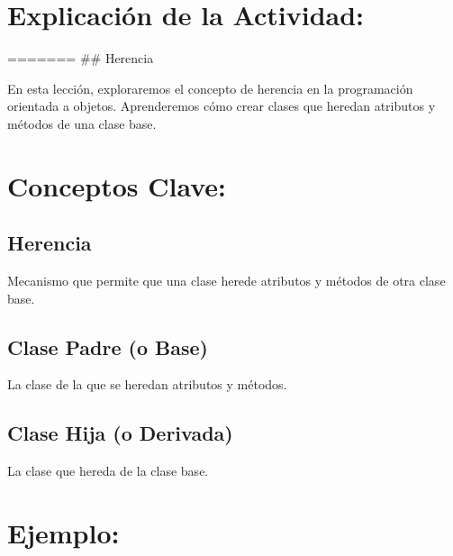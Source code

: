 \documentclass[
  a4paper,
  DIV=11,
  numbers=noendperiod,
  onepage,
  openany]{scrreprt}
\begin{document}
\hypertarget{explicaciuxf3n-de-la-actividad-54}{%
\section{Explicación de la
Actividad:}\label{explicaciuxf3n-de-la-actividad-54}}

======= \#\# Herencia

En esta lección, exploraremos el concepto de herencia en la programación
orientada a objetos. Aprenderemos cómo crear clases que heredan
atributos y métodos de una clase base.

\hypertarget{conceptos-clave-57}{%
\section{Conceptos Clave:}\label{conceptos-clave-57}}

\hypertarget{herencia-2}{%
\subsection{Herencia}\label{herencia-2}}

Mecanismo que permite que una clase herede atributos y métodos de otra
clase base.

\hypertarget{clase-padre-o-base-1}{%
\subsection{Clase Padre (o Base)}\label{clase-padre-o-base-1}}

La clase de la que se heredan atributos y métodos.

\hypertarget{clase-hija-o-derivada-1}{%
\subsection{Clase Hija (o Derivada)}\label{clase-hija-o-derivada-1}}

La clase que hereda de la clase base.

\hypertarget{ejemplo-57}{%
\section{Ejemplo:}\label{ejemplo-57}}
\end{document}

